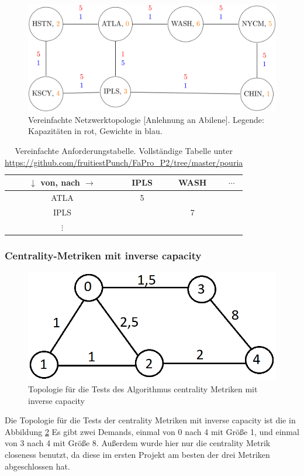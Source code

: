\documentclass[sigconf, nonacm, review]{acmart}
\begin{document}
\begin{figure}
\centering
\includegraphics[width=\linewidth]{figures/pouria_simple_topology.png}
\caption{Vereinfachte Netzwerktopologie [Anlehnung an Abilene]. Legende: Kapazit\"aten in rot, Gewichte in blau.}
\label{fig:pouriaSimpleTopology}
\end{figure}
\begin{table}
\caption{Vereinfachte Anforderungstabelle. Vollst\"andige Tabelle unter \url{https://github.com/fruitiestPunch/FaPro_P2/tree/master/pouria}}
\label{tab:pouriaSimpleTopology}
\begin{tabular}{cccc}
\toprule
$\downarrow$ von, nach $\rightarrow$&IPLS&WASH&$\cdots$\\
\midrule
ATLA & 5 & &\\
IPLS & & 7 & \\
$\vdots$ & & & \\
\bottomrule
\end{tabular}
\end{table}
\subsubsection{Centrality-Metriken mit inverse capacity}
\begin{figure}
\centering
\includegraphics[width=\linewidth]{figures/kai_p2_baseTopo.png}
\caption{Topologie f\"ur die Tests des Algorithmus centrality Metriken mit inverse capacity}
\label{fig:kai_p2_baseTopo}
\end{figure}
Die Topologie f\"ur die Tests der centrality Metriken mit inverse capacity ist die in Abbildung \ref{fig:kai_p2_baseTopo}
Es gibt zwei Demands, einmal von 0 nach 4 mit Gr\"o\ss e 1, und einmal von 3 nach 4 mit Gr\"o\ss e 8.
Au\ss erdem wurde hier nur die centrality Metrik closeness benutzt, da diese im ersten Projekt am besten der drei Metriken abgeschlossen hat.
\end{document}
